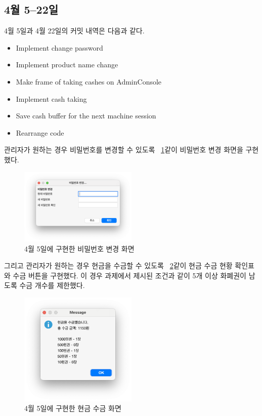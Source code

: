 \documentclass{oblivoir}
\newcommand{\figref}[1]{\figurename~\ref{#1}}
\begin{document}
    \subsection{4월 5--22일}

    4월 5일과 4월 22일의 커밋 내역은 다음과 같다.
    \begin{itemize}
        \item Implement change password
        \item Implement product name change
        \item Make frame of taking cashes on AdminConsole
        \item Implement cash taking
        \item Save cash buffer for the next machine session
        \item Rearrange code
    \end{itemize}

    관리자가 원하는 경우 비밀번호를 변경할 수 있도록 \figref{fig:0405-password-change}\와 같이 비밀번호 변경 화면을 구현했다.
    \begin{figure}[h]
        \centering
        \includegraphics[width=0.5\textwidth]{0405-password-change.png}
        \caption{4월 5일에 구현한 비밀번호 변경 화면}
        \label{fig:0405-password-change}
    \end{figure}

    그리고 관리자가 원하는 경우 현금을 수금할 수 있도록 \figref{fig:0405-cash-take}\와 같이 현금 수금 현황 확인표와 수금 버튼을 구현했다.
    이 경우 과제에서 제시된 조건과 같이 5개 이상 화폐권이 남도록 수금 개수를 제한했다.
    \begin{figure}[h]
        \centering
        \includegraphics[width=0.5\textwidth]{0405-cash-take.png}
        \caption{4월 5일에 구현한 현금 수금 화면}
        \label{fig:0405-cash-take}
    \end{figure}
\end{document}
